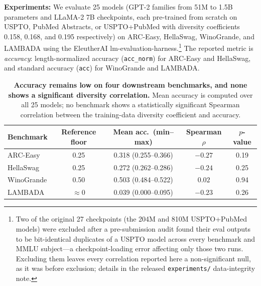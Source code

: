 \textbf{Experiments:}
We evaluate 25 models (GPT-2 families from 51M to 1.5B parameters and LLaMA-2 7B checkpoints, each pre-trained from scratch on USPTO, PubMed Abstracts, or USPTO+PubMed with diversity coefficients 0.158, 0.168, and 0.195 respectively) on ARC-Easy, HellaSwag, WinoGrande, and LAMBADA using the EleutherAI lm-evaluation-harness.\footnote{Two of the original 27 checkpoints (the 204M and 810M USPTO+PubMed models) were excluded after a pre-submission audit found their eval outputs to be bit-identical duplicates of a USPTO model across every benchmark and MMLU subject---a checkpoint-loading error affecting only those two runs. Excluding them leaves every correlation reported here a non-significant null, as it was before exclusion; details in the released \texttt{experiments/} data-integrity note.}
The reported metric is \emph{accuracy}: length-normalized accuracy (\texttt{acc\_norm}) for ARC-Easy and HellaSwag, and standard accuracy (\texttt{acc}) for WinoGrande and LAMBADA.

\begin{table}[h!]
\centering
\caption{\textbf{Accuracy remains low on four downstream benchmarks, and none shows a significant diversity correlation.}
Mean accuracy is computed over all 25 models; no benchmark shows a statistically significant Spearman correlation between the training-data diversity coefficient and accuracy.}
\vskip 0.1in
\begin{small}
\begin{tabular}{lcccc}
\toprule
Benchmark & Reference floor & Mean acc.\ (min--max) & Spearman $\rho$ & $p$-value \\
\midrule
ARC-Easy & 0.25 & 0.318 (0.255--0.366) & $-0.27$ & 0.19 \\
HellaSwag & 0.25 & 0.272 (0.262--0.286) & $-0.24$ & 0.25 \\
WinoGrande & 0.50 & 0.503 (0.484--0.522) & $0.02$ & 0.94 \\
LAMBADA & $\approx 0$ & 0.039 (0.000--0.095) & $-0.23$ & 0.26 \\
\bottomrule
\end{tabular}
\end{small}
\label{tab:downstream_benchmarks}
\end{table}


